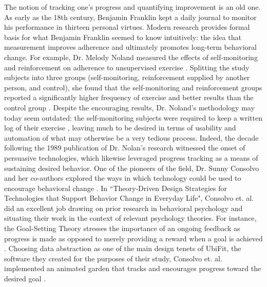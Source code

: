 The notion of tracking one's progress and quantifying improvement is an old one. As early as the 18th century, Benjamin Franklin kept a daily journal to monitor his performance in thirteen personal virtues. 
Modern research provides formal basis for what Benjamin Franklin seemed to know intuitively: the idea that measurement improves adherence and ultimately promotes long-term behavioral change. For example, Dr. Melody Noland measured the effects of self-monitoring and reinforcement on adherence to unsupervised exercise
\cite{Noland1989Effects}. 
Splitting the study subjects into three groups (self-monitoring, reinforcement supplied by another person, and control), she found that the self-monitoring and reinforcement groups reported a significantly higher frequency of exercise and better results than the control group 
\cite{Noland1989Effects}. %
Despite the encouraging results, Dr. Noland's methodology may today seem outdated: the self-monitoring subjects were required to keep a written log of their exercise
\cite{Noland1989Effects}, %
leaving much to be desired in terms of usability and automation of what may otherwise be a very tedious process. Indeed, the decade following the 1989 publication of Dr. Nolan’s research witnessed the onset of persuasive technologies, which likewise leveraged progress tracking as a means of sustaining desired behavior. 
One of the pioneers of the field, Dr. Sunny Consolvo and her co-authors explored the ways in which technology could be used to encourage behavioral change
\cite{Consolvo2009Theory, Consolvo2008Flowers}. %
In ``Theory-Driven Design Strategies for Technologies that Support Behavior Change in Everyday Life", Consolvo et. al. did an excellent job drawing on prior research in behavioral psychology and situating their work in the context of relevant psychology theories. For instance, the Goal-Setting Theory stresses the importance of an ongoing feedback as progress is made as opposed to merely providing a reward when a goal is achieved 
\cite{Consolvo2009Theory}. %
Choosing data abstraction as one of the main design tenets of UbiFit, the software they created for the purposes of their study, Consolvo et. al. implemented an animated garden that tracks and encourages progress toward the desired goal 
\cite{Consolvo2009Theory, Consolvo2008Flowers}. %
